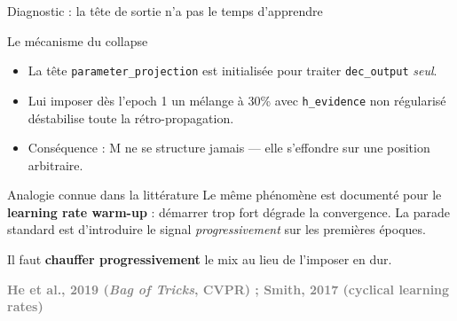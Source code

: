\documentclass[10pt]{beamer}
\newcommand{\source}[1]{\vspace{4pt}\hfill{\textcolor{gray}{\textbf{\tiny #1}}}}
\begin{document}
\begin{frame}{Diagnostic : la tête de sortie n'a pas le temps d'apprendre}
  \begin{block}{Le mécanisme du collapse}
    \begin{itemize}
      \item La tête \texttt{parameter\_projection} est initialisée pour traiter \texttt{dec\_output} \emph{seul}.
      \item Lui imposer dès l'epoch 1 un mélange à 30\% avec \texttt{h\_evidence} non régularisé déstabilise toute la rétro-propagation.
      \item Conséquence : M ne se structure jamais --- elle s'effondre sur une position arbitraire.
    \end{itemize}
  \end{block}

  \begin{exampleblock}{Analogie connue dans la littérature}
    Le même phénomène est documenté pour le \textbf{learning rate warm-up} : démarrer trop fort dégrade la convergence. La parade standard est d'introduire le signal \emph{progressivement} sur les premières époques.
  \end{exampleblock}

  \begin{verdictbox}
    Il faut \textbf{chauffer progressivement} le mix au lieu de l'imposer en dur.
  \end{verdictbox}
	\vspace{-0.3cm}
  \source{He et al., 2019 (\textit{Bag of Tricks}, CVPR) ; Smith, 2017 (cyclical learning rates)}
\end{frame}
\end{document}
